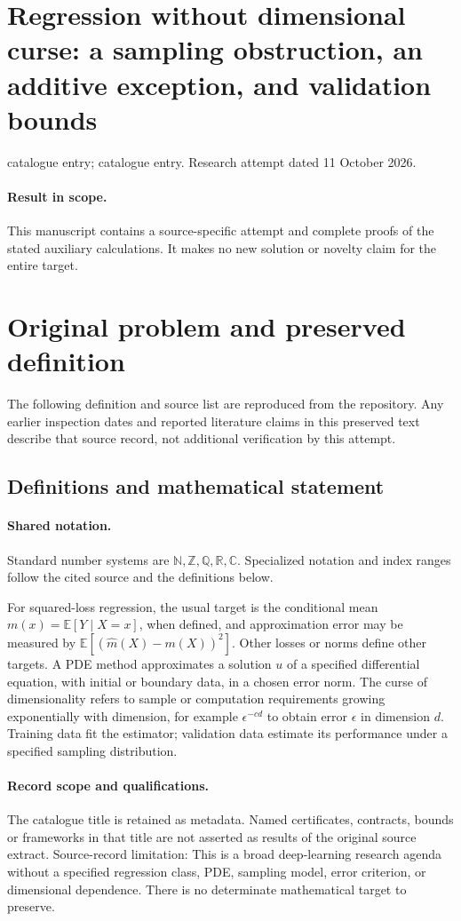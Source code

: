 \documentclass[11pt]{article}
\begin{document}
\section*{Regression without dimensional curse: a sampling obstruction, an additive exception, and validation bounds}
\noindent catalogue entry; catalogue entry. Research attempt dated 11 October 2026.
\paragraph{Result in scope.}This manuscript contains a source-specific attempt and complete proofs of the stated auxiliary calculations. It makes no new solution or novelty claim for the entire target.
\section{Original problem and preserved definition}
The following definition and source list are reproduced from the repository. Any earlier inspection dates and reported literature claims in this preserved text describe that source record, not additional verification by this attempt.
\subsection{Definitions and mathematical statement}

\paragraph{Shared notation.}Standard number systems are $\mathbb N,\mathbb Z,\mathbb Q,\mathbb R,\mathbb C$. Specialized notation and index ranges follow the cited source and the definitions below.


For squared-loss regression, the usual target is the conditional mean $m(x)=\mathbb E[Y\mid X=x]$, when defined, and approximation error may be measured by $\mathbb E[(\widehat m(X)-m(X))^2]$. Other losses or norms define other targets. A PDE method approximates a solution $u$ of a specified differential equation, with initial or boundary data, in a chosen error norm. The curse of dimensionality refers to sample or computation requirements growing exponentially with dimension, for example $\epsilon^{-c d}$ to obtain error $\epsilon$ in dimension $d$. Training data fit the estimator; validation data estimate its performance under a specified sampling distribution.
\paragraph{Record scope and qualifications.}
The catalogue title is retained as metadata. Named certificates, contracts, bounds or frameworks in that title are not asserted as results of the original source extract.
Source-record limitation: This is a broad deep-learning research agenda without a specified regression class, PDE, sampling model, error criterion, or dimensional dependence. There is no determinate mathematical target to preserve.
\end{document}
